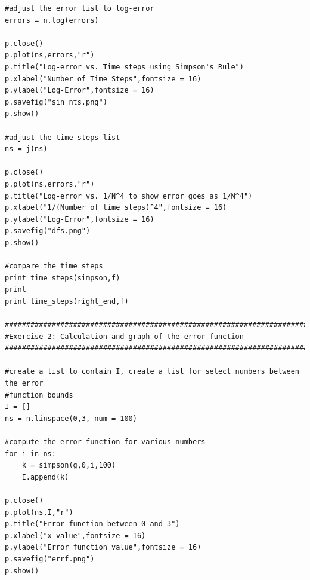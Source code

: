 \documentclass[11pt]{article}
\begin{document}
\begin{verbatim}
#adjust the error list to log-error
errors = n.log(errors)

p.close()
p.plot(ns,errors,"r")
p.title("Log-error vs. Time steps using Simpson's Rule")
p.xlabel("Number of Time Steps",fontsize = 16)
p.ylabel("Log-Error",fontsize = 16)
p.savefig("sin_nts.png")
p.show()

#adjust the time steps list
ns = j(ns)

p.close()
p.plot(ns,errors,"r")
p.title("Log-error vs. 1/N^4 to show error goes as 1/N^4")
p.xlabel("1/(Number of time steps)^4",fontsize = 16)
p.ylabel("Log-Error",fontsize = 16)
p.savefig("dfs.png")
p.show()

#compare the time steps
print time_steps(simpson,f)
print
print time_steps(right_end,f)

#########################################################################
#Exercise 2: Calculation and graph of the error function
#########################################################################

#create a list to contain I, create a list for select numbers between the error
#function bounds
I = []
ns = n.linspace(0,3, num = 100)

#compute the error function for various numbers
for i in ns:
    k = simpson(g,0,i,100)
    I.append(k)
    
p.close()
p.plot(ns,I,"r")
p.title("Error function between 0 and 3")
p.xlabel("x value",fontsize = 16)
p.ylabel("Error function value",fontsize = 16)
p.savefig("errf.png")
p.show()
\end{verbatim}
\end{document}
